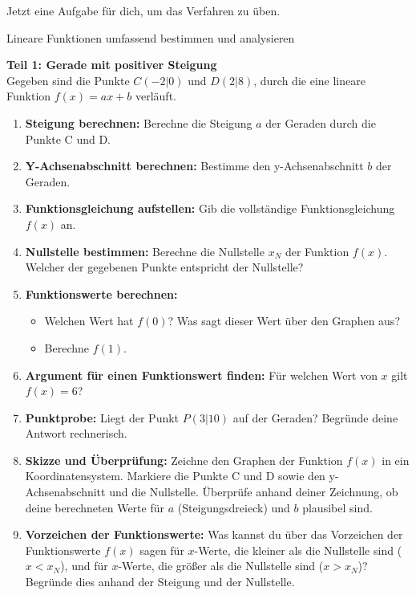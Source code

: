 
Jetzt eine Aufgabe für dich, um das Verfahren zu üben.

\begin{aufgabenumgebung}{Lineare Funktionen umfassend bestimmen und analysieren}

\textbf{Teil 1: Gerade mit positiver Steigung} \\
Gegeben sind die Punkte $C(-2|0)$ und $D(2|8)$, durch die eine lineare Funktion $f(x) = ax+b$ verläuft.

\begin{enumerate}[label=(\alph*)]
    \item \textbf{Steigung berechnen:} Berechne die Steigung $a$ der Geraden durch die Punkte C und D.
    \item \textbf{Y-Achsenabschnitt berechnen:} Bestimme den y-Achsenabschnitt $b$ der Geraden.
    \item \textbf{Funktionsgleichung aufstellen:} Gib die vollständige Funktionsgleichung $f(x)$ an.
    \item \textbf{Nullstelle bestimmen:} Berechne die Nullstelle $x_N$ der Funktion $f(x)$. Welcher der gegebenen Punkte entspricht der Nullstelle?
    \item \textbf{Funktionswerte berechnen:}
        \begin{itemize}
            \item Welchen Wert hat $f(0)$? Was sagt dieser Wert über den Graphen aus?
            \item Berechne $f(1)$.
        \end{itemize}
    \item \textbf{Argument für einen Funktionswert finden:} Für welchen Wert von $x$ gilt $f(x) = 6$?
    \item \textbf{Punktprobe:} Liegt der Punkt $P(3|10)$ auf der Geraden? Begründe deine Antwort rechnerisch.
    \item \textbf{Skizze und Überprüfung:} Zeichne den Graphen der Funktion $f(x)$ in ein Koordinatensystem. Markiere die Punkte C und D sowie den y-Achsenabschnitt und die Nullstelle. Überprüfe anhand deiner Zeichnung, ob deine berechneten Werte für $a$ (Steigungsdreieck) und $b$ plausibel sind.
    \item \textbf{Vorzeichen der Funktionswerte:} Was kannst du über das Vorzeichen der Funktionswerte $f(x)$ sagen für $x$-Werte, die kleiner als die Nullstelle sind ($x < x_N$), und für $x$-Werte, die größer als die Nullstelle sind ($x > x_N$)? Begründe dies anhand der Steigung und der Nullstelle.
\end{enumerate}


\end{aufgabenumgebung}
